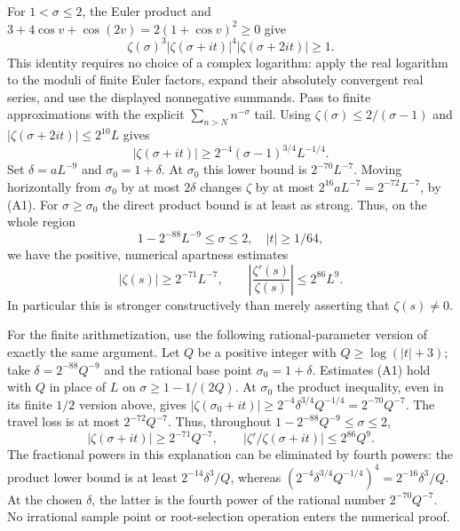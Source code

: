For $1<\sigma\le2$, the Euler product and
$3+4\cos v+\cos(2v)=2(1+\cos v)^2\ge0$ give
\[
 \zeta(\sigma)^3|\zeta(\sigma+it)|^4
 |\zeta(\sigma+2it)|\ge1.                                      \tag{A2}
\]
This identity requires no choice of a complex logarithm: apply the real
logarithm to the moduli of finite Euler factors, expand their absolutely
convergent real series, and use the displayed nonnegative summands. Pass to
finite approximations with the explicit $\sum_{n>N}n^{-\sigma}$ tail.
Using $\zeta(\sigma)\le2/(\sigma-1)$ and
$|\zeta(\sigma+2it)|\le 2^{10}L$ gives
\[
 |\zeta(\sigma+it)|\ge2^{-4}(\sigma-1)^{3/4}L^{-1/4}.
\]
Set $\delta=aL^{-9}$ and $\sigma_0=1+\delta$.
At $\sigma_0$ this lower bound is $2^{-70}L^{-7}$.
Moving horizontally from $\sigma_0$ by at most $2\delta$ changes $\zeta$
by at most $2^{16}aL^{-7}=2^{-72}L^{-7}$, by (A1).
For $\sigma\ge\sigma_0$ the direct product bound is at least as strong.
Thus, on the whole region
\[
 1-2^{-88}L^{-9}\le\sigma\le2,\quad |t|\ge1/64,
\]
we have the positive, numerical apartness estimates
\[
 |\zeta(s)|\ge2^{-71}L^{-7},\qquad
 \left|\frac{\zeta'(s)}{\zeta(s)}\right|\le2^{86}L^9.             \tag{A3}
\]
In particular this is stronger constructively than merely asserting that
$\zeta(s)\ne0$.

For the finite arithmetization, use the following rational-parameter
version of exactly the same argument. Let $Q$ be a positive integer with
$Q\ge\log(|t|+3)$; take $\delta=2^{-88}Q^{-9}$ and the rational base
point $\sigma_0=1+\delta$. Estimates (A1) hold with $Q$ in place of $L$
on $\sigma\ge1-1/(2Q)$. At $\sigma_0$ the product inequality, even in
its finite $1/2$ version above, gives
$|\zeta(\sigma_0+it)|\ge2^{-4}\delta^{3/4}Q^{-1/4}
=2^{-70}Q^{-7}$. The travel loss is at most $2^{-72}Q^{-7}$.
Thus, throughout $1-2^{-88}Q^{-9}\le\sigma\le2$,
\[
 |\zeta(\sigma+it)|\ge2^{-71}Q^{-7},\qquad
 |\zeta'/\zeta(\sigma+it)|\le2^{86}Q^9.                    \tag{A3r}
\]
The fractional powers in this explanation can be eliminated by fourth
powers: the product lower bound is at least
$2^{-14}\delta^3/Q$, whereas $(2^{-4}\delta^{3/4}Q^{-1/4})^4
=2^{-16}\delta^3/Q$. At the chosen $\delta$, the latter is the fourth
power of the rational number $2^{-70}Q^{-7}$. No irrational sample
point or root-selection operation enters the numerical proof.

